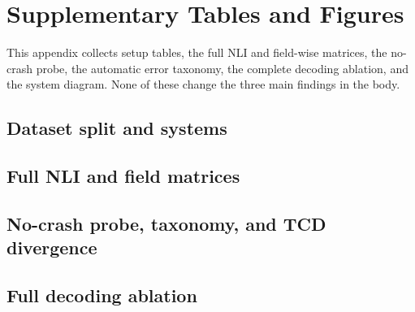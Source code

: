 \section{Supplementary Tables and Figures}
\label{sec:appendix}

This appendix collects setup tables, the full NLI and field-wise matrices, the no-crash probe, the automatic error taxonomy, the complete decoding ablation, and the system diagram. None of these change the three main findings in the body.

\subsection{Dataset split and systems}
\label{sec:app-setup}





\subsection{Full NLI and field matrices}
\label{sec:app-nli}



\subsection{No-crash probe, taxonomy, and TCD divergence}
\label{sec:app-errors}





\subsection{Full decoding ablation}
\label{sec:app-ablation}


